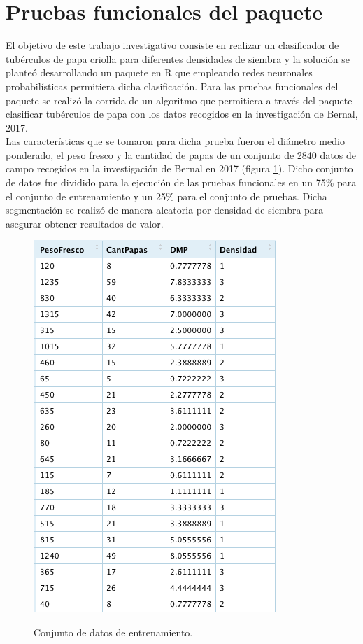 \section{Pruebas funcionales del paquete}

	El objetivo de este trabajo investigativo consiste en realizar un clasificador de tubérculos de papa criolla para diferentes densidades de siembra y la solución se planteó desarrollando un paquete en R que empleando redes neuronales probabilísticas permitiera dicha clasificación. Para las pruebas funcionales del paquete se realizó la corrida de un algoritmo que permitiera a través del paquete clasificar tubérculos de papa con los datos recogidos en la investigación de Bernal, 2017. \\
	
	Las características que se tomaron para dicha prueba fueron el diámetro medio ponderado, el peso fresco y la cantidad de papas de un conjunto de 2840 datos de campo recogidos en la investigación de Bernal en 2017 (figura \ref{fig:input}). Dicho conjunto de datos fue dividido para la ejecución de las pruebas funcionales en un 75\% para el conjunto de entrenamiento y un 25\% para el conjunto de pruebas. Dicha segmentación se realizó de manera aleatoria por densidad de siembra para asegurar obtener resultados de valor.\\
	
\begin{figure}[h!]
	\caption{Conjunto de datos de entrenamiento.}
	\centering
	\includegraphics[scale=0.6]{input.png}
	\label{fig:input}
\end{figure}

